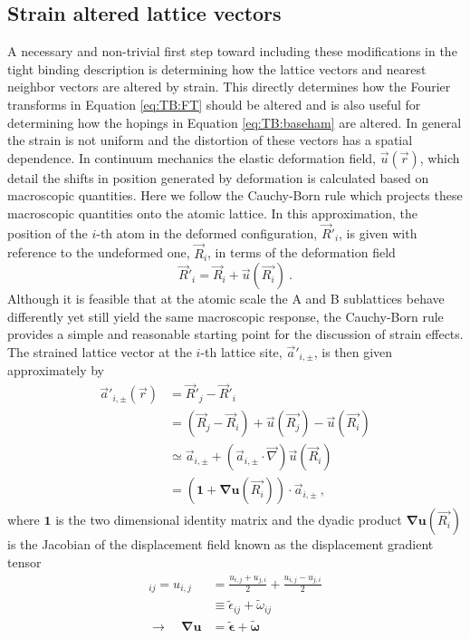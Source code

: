 \subsection{Strain altered lattice vectors}
A necessary and non-trivial first step toward including these modifications in the tight binding description is determining how the lattice vectors and nearest neighbor vectors are altered by strain.
This directly determines how the Fourier transforms in Equation \ref{eq:TB:FT} should be altered and is also useful for determining how the hopings in Equation \ref{eq:TB:baseham} are altered.
In general the strain is not uniform and the distortion of these vectors has a spatial dependence.
In continuum mechanics the elastic deformation field, $\vec{u}(\vec{r})$, which detail the shifts in position generated by  deformation is calculated based on macroscopic quantities.
Here we follow the Cauchy-Born rule which projects these macroscopic quantities onto the atomic lattice.
In this approximation, the position of the $i$-th atom in the deformed configuration, $\vec{R}'_i$, is given with reference to the undeformed one, $\vec{R}_i$, in terms of the deformation field
\begin{equation*}
  \vec{R}'_{i}=\vec{R}_{i}+\vec{u}(\vec{R_i}) \ .
\end{equation*}
Although it is feasible that at the atomic scale the A and B sublattices behave differently yet still yield the same macroscopic response, the Cauchy-Born rule provides a simple and reasonable starting point for the discussion of strain effects.
The strained lattice vector at the $i$-th lattice site, $\vec{a}'_{i,\pm}$, is then given approximately by
\begin{align}
  \vec{a}'_{i,\pm}(\vec{r})&=\vec{R}'_j-\vec{R}'_i \nonumber\\
                              &=(\vec{R}_j-\vec{R}_i)+\vec{u}(\vec{R_j})-\vec{u}(\vec{R_i}) \nonumber \\
                              &\simeq\vec{a}_{i,\pm}+(\vec{a}_{i,\pm} \cdot \vec{\nabla}) \vec{u}(\vec{R}_i) \nonumber \\
                              &=\left(\bm{1}+\bm{\nabla u}(\vec{R_i}) \right)\cdot \vec{a}_{i,\pm} \label{eq:PVP:StrainVectors} \ ,
\end{align}
where $\bm{1}$ is the two dimensional identity matrix and the dyadic product $\bm{\nabla u}(\vec{R_i})$ is the Jacobian of the displacement field known as the displacement gradient tensor
\begin{align*}
  [\bm{\nabla u}]_{ij} = u_{i,j} &= \frac{u_{i,j}+u_{j,i}}{2} + \frac{u_{i,j}-u_{j,i}}{2} \\
                       &\equiv \tilde{\epsilon}_{ij} + \tilde{\omega}_{ij} \\
    \rightarrow \quad \bm{\nabla u} &= \tilde{\bm{\epsilon}} + \tilde{\bm{\omega}}
\end{align*}
